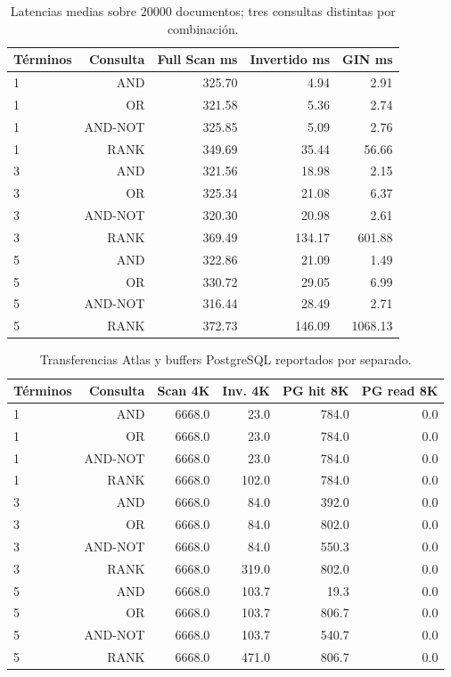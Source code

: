 \begin{table}[H]\centering\footnotesize\renewcommand{\arraystretch}{1.0}
\caption{Latencias medias sobre 20000 documentos; tres consultas distintas por combinación.}
\begin{tabular}{@{}lrrrr@{}}\toprule
Términos & Consulta & Full Scan ms & Invertido ms & GIN ms \\ \midrule
1 & AND & 325.70 & 4.94 & 2.91 \\
1 & OR & 321.58 & 5.36 & 2.74 \\
1 & AND-NOT & 325.85 & 5.09 & 2.76 \\
1 & RANK & 349.69 & 35.44 & 56.66 \\
3 & AND & 321.56 & 18.98 & 2.15 \\
3 & OR & 325.34 & 21.08 & 6.37 \\
3 & AND-NOT & 320.30 & 20.98 & 2.61 \\
3 & RANK & 369.49 & 134.17 & 601.88 \\
5 & AND & 322.86 & 21.09 & 1.49 \\
5 & OR & 330.72 & 29.05 & 6.99 \\
5 & AND-NOT & 316.44 & 28.49 & 2.71 \\
5 & RANK & 372.73 & 146.09 & 1068.13 \\
\bottomrule\end{tabular}\end{table}

\begin{table}[H]\centering\footnotesize\renewcommand{\arraystretch}{1.0}
\caption{Transferencias Atlas y buffers PostgreSQL reportados por separado.}
\begin{tabular}{@{}lrrrrr@{}}\toprule
Términos & Consulta & Scan 4K & Inv. 4K & PG hit 8K & PG read 8K \\ \midrule
1 & AND & 6668.0 & 23.0 & 784.0 & 0.0 \\
1 & OR & 6668.0 & 23.0 & 784.0 & 0.0 \\
1 & AND-NOT & 6668.0 & 23.0 & 784.0 & 0.0 \\
1 & RANK & 6668.0 & 102.0 & 784.0 & 0.0 \\
3 & AND & 6668.0 & 84.0 & 392.0 & 0.0 \\
3 & OR & 6668.0 & 84.0 & 802.0 & 0.0 \\
3 & AND-NOT & 6668.0 & 84.0 & 550.3 & 0.0 \\
3 & RANK & 6668.0 & 319.0 & 802.0 & 0.0 \\
5 & AND & 6668.0 & 103.7 & 19.3 & 0.0 \\
5 & OR & 6668.0 & 103.7 & 806.7 & 0.0 \\
5 & AND-NOT & 6668.0 & 103.7 & 540.7 & 0.0 \\
5 & RANK & 6668.0 & 471.0 & 806.7 & 0.0 \\
\bottomrule\end{tabular}\end{table}


